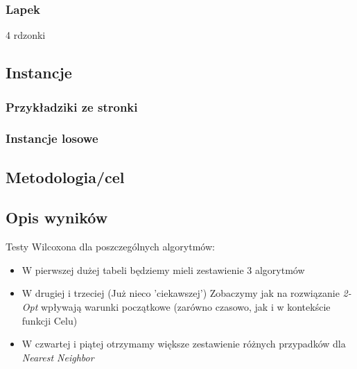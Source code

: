 \documentclass{article}
\begin{document}
\subsubsection{Lapek}
4 rdzonki

\subsection{Instancje}
\subsubsection{Przykładziki ze stronki}

\subsubsection{Instancje losowe}

\subsection{Metodologia/cel}

\subsection{Opis wyników}
Testy Wilcoxona dla poszczególnych algorytmów:
\begin{itemize}
	\item W pierwszej dużej tabeli będziemy mieli zestawienie 3 algorytmów
	\item W drugiej i trzeciej (Już nieco 'ciekawszej') Zobaczymy jak na rozwiązanie \textit{2-Opt} wpływają warunki początkowe (zarówno czasowo, jak i w kontekście funkcji Celu)
	\item W czwartej i piątej otrzymamy większe zestawienie różnych przypadków dla \textit{Nearest Neighbor}
\end{itemize}

\newpage
\end{document}

